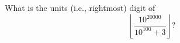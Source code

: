 What is the units (i.e., rightmost) digit of
\[
\left\lfloor \frac{10^{20000}}{10^{100}+3}\right\rfloor ?
\]

